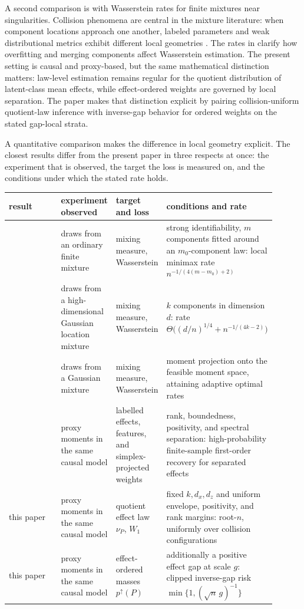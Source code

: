 \documentclass[11pt]{article}
\begin{document}
A second comparison is with Wasserstein rates for finite mixtures near singularities. Collision phenomena are central in the mixture literature: when component locations approach one another, labeled parameters and weak distributional metrics exhibit different local geometries \citep{Nguyen2013,HoNguyenWeak2016,HeinrichKahn2018,HoNguyen2016,ManoleHo2022,NguyenLeRinaldoHo2026}. The rates in \citet{HeinrichKahn2018} clarify how overfitting and merging components affect Wasserstein estimation. The present setting is causal and proxy-based, but the same mathematical distinction matters: law-level estimation remains regular for the quotient distribution of latent-class mean effects, while effect-ordered weights are governed by local separation. The paper makes that distinction explicit by pairing collision-uniform quotient-law inference with inverse-gap behavior for ordered weights on the stated gap-local strata.

A quantitative comparison makes the difference in local geometry explicit. The closest results differ from the present paper in three respects at once: the experiment that is observed, the target the loss is measured on, and the conditions under which the stated rate holds.

\begin{center}
\small
\begin{tabular}{p{0.20\linewidth}p{0.17\linewidth}p{0.17\linewidth}p{0.36\linewidth}}
result & experiment observed & target and loss & conditions and rate\\
\hline
\citet{HeinrichKahn2018} & draws from an ordinary finite mixture & mixing measure, Wasserstein & strong identifiability, \(m\) components fitted around an \(m_0\)-component law: local minimax rate \(n^{-1/(4(m-m_0)+2)}\)\\
\citet{DossWuYangZhou2023} & draws from a high-dimensional Gaussian location mixture & mixing measure, Wasserstein & \(k\) components in dimension \(d\): rate \(\Theta\bigl((d/n)^{1/4}+n^{-1/(4k-2)}\bigr)\)\\
\citet{WuYang2020} & draws from a Gaussian mixture & mixing measure, Wasserstein & moment projection onto the feasible moment space, attaining adaptive optimal rates\\
\citet{VirkMazaheriWu2026} & proxy moments in the same causal model & labelled effects, features, and simplex-projected weights & rank, boundedness, positivity, and spectral separation: high-probability finite-sample first-order recovery for separated effects\\
this paper & proxy moments in the same causal model & quotient effect law \(\nu_P\), \(W_1\) & fixed \(k,d_x,d_z\) and uniform envelope, positivity, and rank margins: root-\(n\), uniformly over collision configurations\\
this paper & proxy moments in the same causal model & effect-ordered masses \(p^\uparrow(P)\) & additionally a positive effect gap at scale \(g\): clipped inverse-gap risk \(\min\{1,(\sqrt n\,g)^{-1}\}\)\\
\end{tabular}
\end{center}
\end{document}
